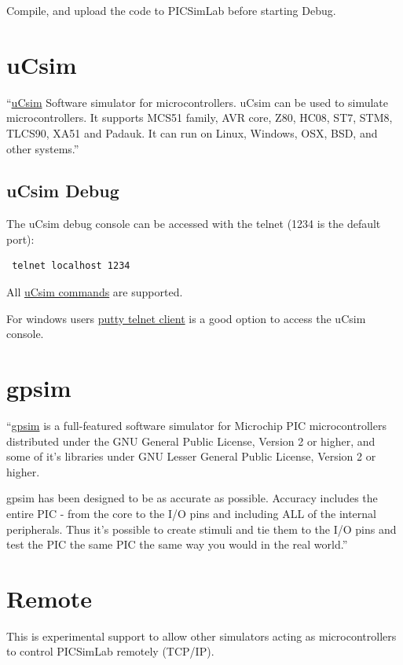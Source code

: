 Compile, and upload the code to PICSimLab before starting Debug.
 
 
\section{uCsim} \hypertarget{def:ucsim}{}
``\href{http://mazsola.iit.uni-miskolc.hu/\%7edrdani/embedded/ucsim/}{uCsim} Software simulator for microcontrollers. uCsim can be used to simulate microcontrollers. It supports MCS51 family, AVR core, Z80, HC08, ST7, STM8, TLCS90, XA51 and Padauk. It can run on Linux, Windows, OSX, BSD, and other systems.''

\subsection{uCsim Debug} \hypertarget{def:ucsimdbg}{}
  
The uCsim debug console can be accessed with the telnet (1234 is the default port):
 \begin{verbatim}
 telnet localhost 1234
 \end{verbatim}
 
All \href{http://mazsola.iit.uni-miskolc.hu/\%7edrdani/embedded/ucsim/cmd.html}{uCsim commands} are supported.  

For windows users \href{https://www.putty.org/}{putty telnet client} is a good option to access the uCsim console. 
 
  
\section{gpsim} \hypertarget{def:gpsim}{}

``\href{http://gpsim.sourceforge.net/}{gpsim} is a full-featured software simulator for Microchip PIC microcontrollers distributed under the GNU General Public License, Version 2 or higher, and some of it's libraries under GNU Lesser General Public License, Version 2 or higher.

gpsim has been designed to be as accurate as possible. Accuracy includes the entire PIC - from the core to the I/O pins and including ALL of the internal peripherals. Thus it's possible to create stimuli and tie them to the I/O pins and test the PIC the same PIC the same way you would in the real world.'' 
  
  
\section{Remote} \hypertarget{def:remote}{}

This is experimental support to allow other simulators acting as microcontrollers to control PICSimLab remotely (TCP/IP).
